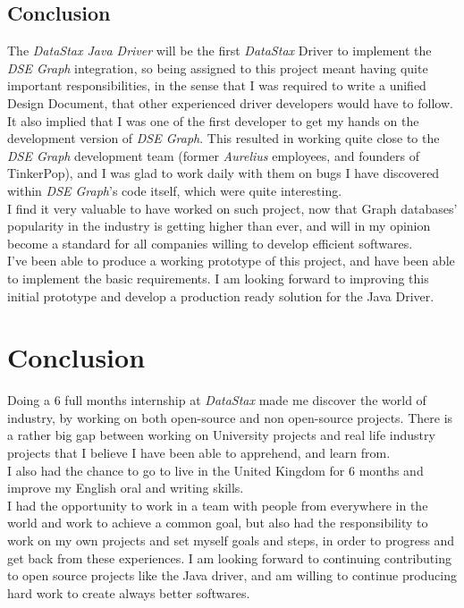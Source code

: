 \documentclass[a4paper]{report}
\newcommand{\ds}{\emph{DataStax\xspace}}
\newcommand{\djd}{\emph{DataStax Java Driver\xspace}}
\begin{document}
\section{Conclusion}
The \djd{} will be the first \ds{} Driver to implement the \emph{DSE Graph} integration, so being assigned to this project meant having quite important responsibilities, in the sense that I was required to write a unified Design Document, that other experienced driver developers would have to follow. It also implied that I was one of the first developer to get my hands on the development version of \emph{DSE Graph}. This resulted in working quite close to the \emph{DSE Graph} development team (former \emph{Aurelius} employees, and founders of TinkerPop), and I was glad to work daily with them on bugs I have discovered within \emph{DSE Graph}'s code itself, which were quite interesting.\\
I find it very valuable to have worked on such project, now that Graph databases' popularity in the industry is getting higher than ever, and will in my opinion become a standard for all companies willing to develop efficient softwares.\\
I've been able to produce a working prototype of this project, and have been able to implement the basic requirements. I am looking forward to improving this initial prototype and develop a production ready solution for the Java Driver.

\chapter{Conclusion}
Doing a 6 full months internship at \emph{DataStax} made me discover the world of industry, by working on both open-source and non open-source projects. There is a rather big gap between working on University projects and real life industry projects that I believe I have been able to apprehend, and learn from.\\
I also had the chance to go to live in the United Kingdom for 6 months and improve my English oral and writing skills.\\
I had the opportunity to work in a team with people from everywhere in the world and work to achieve a common goal, but also had the responsibility to work on my own projects and set myself goals and steps, in order to progress and get back from these experiences.
I am looking forward to continuing contributing to open source projects like the Java driver, and am willing to continue producing hard work to create always better softwares.



\end{document}
